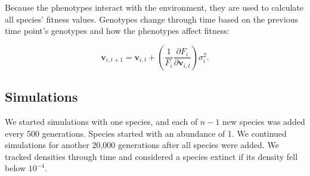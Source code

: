 
Because the phenotypes interact with the environment, they are used
to calculate all species' fitness values.
Genotypes change through time based on the previous time point's 
genotypes and how the phenotypes affect fitness:

\begin{equation} \label{eq:axis-change-stochastic}
    \mathbf{v}_{i,t+1} = \mathbf{v}_{i,t} + \left( \frac{1}{F_i}
        \frac{\partial F_i}{\partial \mathbf{\ddot{v}}_{i,t}} \right) \sigma^2_i
    \textrm{.}
\end{equation}





\subsection*{Simulations}


We started simulations with one species, and each of $n-1$ new species
was added every 500 generations.
Species started with an abundance of 1.
We continued simulations for another 20,000 generations after all
species were added.
We tracked densities through time and considered a species extinct if its 
density fell below $10^{-4}$.









